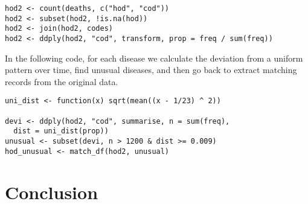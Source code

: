 \documentclass[oneside]{article}
\begin{document}
\begin{verbatim}
hod2 <- count(deaths, c("hod", "cod"))
hod2 <- subset(hod2, !is.na(hod))
hod2 <- join(hod2, codes)
hod2 <- ddply(hod2, "cod", transform, prop = freq / sum(freq))
\end{verbatim}

In the following code, for each disease we calculate the deviation from a uniform pattern over time, find unusual diseases, and then go back to extract matching records from the original data.

\begin{verbatim}
uni_dist <- function(x) sqrt(mean((x - 1/23) ^ 2))

devi <- ddply(hod2, "cod", summarise, n = sum(freq), 
  dist = uni_dist(prop))
unusual <- subset(devi, n > 1200 & dist >= 0.009)
hod_unusual <- match_df(hod2, unusual)
\end{verbatim}

\section{Conclusion}


\end{document}
